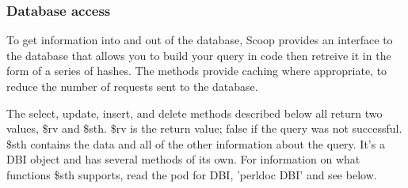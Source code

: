 \subsubsection{Database access}

To get information into and out of the database, Scoop provides an interface to the database that allows you to build your query in code then retreive it in the form of a series of hashes. The methods provide caching where appropriate, to reduce the number of requests sent to the database.

The select, update, insert, and delete methods described below all return two values, \$rv and \$sth. \$rv is the return value; false if the query was not successful. \$sth contains the data and all of the other information about the query. It's a DBI object and has several methods of its own.  For information on what functions \$sth supports, read the pod for DBI, 'perldoc DBI' and see below.

